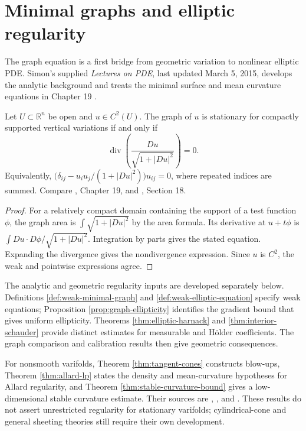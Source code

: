 \chapter{Minimal graphs and elliptic regularity}\label{sec:minimal-graphs}
The graph equation is a first bridge from geometric variation to nonlinear elliptic PDE. Simon's supplied \emph{Lectures on PDE}, last updated March 5, 2015, develops the analytic background and treats the minimal surface and mean curvature equations in Chapter 19 \cite{SimonPDE}.

\begin{proposition}\label{prop:minimal-graph-pde}
Let $U\subset\mathbb R^n$ be open and $u\in C^2(U)$. The graph of $u$ is stationary for compactly supported vertical variations if and only if
\[
 \operatorname{div}\left(\frac{Du}{\sqrt{1+|Du|^2}}\right)=0.
\]
Equivalently,
$\bigl(\delta_{ij}-u_i u_j/(1+|Du|^2)\bigr)u_{ij}=0$,
where repeated indices are summed. Compare \cite{SimonPDE}, Chapter 19, and \cite{ChMin}, Section 18.
\end{proposition}
\begin{proof}
For a relatively compact domain containing the support of a test function $\phi$, the graph area is $\int\sqrt{1+|Du|^2}$ by the area formula. Its derivative at $u+t\phi$ is
$\int Du\cdot D\phi/\sqrt{1+|Du|^2}$.
Integration by parts gives the stated equation. Expanding the divergence gives the nondivergence expression. Since $u$ is $C^2$, the weak and pointwise expressions agree.
\end{proof}

\begin{remark}\label{rem:regularity-program}
The analytic and geometric regularity inputs are developed separately below. Definitions \ref{def:weak-minimal-graph} and \ref{def:weak-elliptic-equation} specify weak equations; Proposition \ref{prop:graph-ellipticity} identifies the gradient bound that gives uniform ellipticity. Theorems \ref{thm:elliptic-harnack} and \ref{thm:interior-schauder} provide distinct estimates for measurable and Hölder coefficients. The graph comparison and calibration results then give geometric consequences.

For nonsmooth varifolds, Theorem \ref{thm:tangent-cones} constructs blow-ups, Theorem \ref{thm:allard-lp} states the density and mean-curvature hypotheses for Allard regularity, and Theorem \ref{thm:stable-curvature-bound} gives a low-dimensional stable curvature estimate. Their sources are \cite{SimonPDE}, \cite{ChMin}, and \cite{Minter}. These results do not assert unrestricted regularity for stationary varifolds; cylindrical-cone and general sheeting theories still require their own development.
\end{remark}

